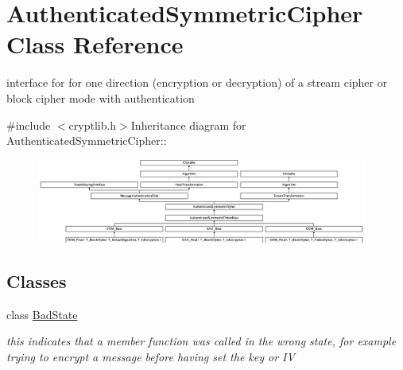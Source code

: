\hypertarget{class_authenticated_symmetric_cipher}{
\section{AuthenticatedSymmetricCipher Class Reference}
\label{class_authenticated_symmetric_cipher}
}


interface for for one direction (encryption or decryption) of a stream cipher or block cipher mode with authentication  


{\ttfamily \#include $<$cryptlib.h$>$}Inheritance diagram for AuthenticatedSymmetricCipher::\begin{figure}[H]
\begin{center}
\leavevmode
\includegraphics[height=2.75862cm]{class_authenticated_symmetric_cipher}
\end{center}
\end{figure}
\subsection*{Classes}
\begin{DoxyCompactItemize}
\item 
class \hyperlink{class_authenticated_symmetric_cipher_1_1_bad_state}{BadState}
\begin{DoxyCompactList}\small\item\em this indicates that a member function was called in the wrong state, for example trying to encrypt a message before having set the key or IV \item\end{DoxyCompactList}\end{DoxyCompactItemize}
